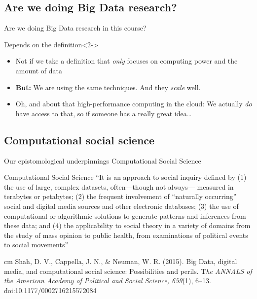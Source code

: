 \documentclass{beamer}
\begin{document}
\subsection{Are we doing Big Data research?}

\begin{frame}{Are we doing Big Data research in this course?}
\begin{block}{Depends on the definition}<2->
\begin{itemize}
\item Not if we take a definition that \emph{only} focuses on computing power and the amount of data
\item<3-> \textbf{But:} We are using the same techniques. And they \emph{scale} well.
\item<4-> Oh, and about that high-performance computing in the cloud: We actually \emph{do} have access to that, so if someone has a really great idea\ldots
\end{itemize}

\end{block}
\end{frame}

\subsection{Computational social science}
\begin{frame}{Our epistomological underpinnings}
Computational Social Science
\end{frame}

\begin{frame}{Computational Social Science}
``It is an approach to social inquiry defined by (1) the use of large, complex datasets, often—though not always— measured in terabytes or petabytes; (2) the frequent involvement of “naturally occurring” social and digital media sources and other electronic databases; (3) the use of computational or algorithmic solutions to generate patterns and inferences from these data; and (4) the applicability to social theory in a variety of domains from the study of mass opinion to public health, from examinations of political events to social movements''

 cm
\tiny{Shah, D. V., Cappella, J. N., \& Neuman, W. R. (2015). Big Data, digital media, and computational social science: Possibilities and perils. T\textit{he ANNALS of the American Academy of Political and Social Science, 659}(1), 6–13. doi:10.1177/0002716215572084}
\end{frame}
\end{document}
